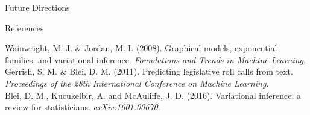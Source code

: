 \documentclass[final]{beamer}
\newlength{\onecolwid}
\begin{document}
\begin{frame}[t]
\begin{columns}[t]
\begin{column}{\onecolwid}
\begin{block}{Future Directions}
\end{block}


\begin{block}{References}

\small{

\noindent[1] Wainwright, M. J. \& Jordan, M. I. (2008). Graphical models, exponential families, and variational inference. {\itshape Foundations and Trends in Machine Learning}. \\

\noindent[2] Gerrish, S. M. \& Blei, D. M. (2011). Predicting legislative roll calls from text. {\itshape Proceedings of the 28th International Conference on Machine Learning}. \\

\noindent[3] Blei, D. M., Kucukelbir, A. and McAuliffe, J. D. (2016). Variational inference: a review for statisticians. {\sl arXiv:1601.00670}.
}
\end{block}


%
%
%


%
%
%


\end{column}
\end{columns}
\end{frame}
\end{document}
